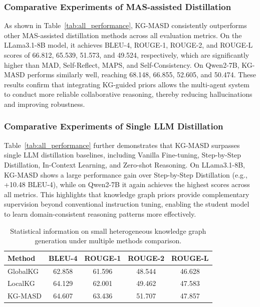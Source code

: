 \documentclass[preprint,12pt]{elsarticle}
\def\textbf#1{#1}%
\begin{document}
\subsubsection{Comparative Experiments of MAS-assisted Distillation}
As shown in Table~\ref{tab:all_performance}, KG-MASD consistently outperforms other MAS-assisted distillation methods across all evaluation metrics.
On the LLama3.1-8B model, it achieves BLEU-4, ROUGE-1, ROUGE-2, and ROUGE-L scores of \textbf{66.812}, \textbf{65.539}, \textbf{51.573}, and \textbf{49.524}, respectively, which are significantly higher than MAD, Self-Reflect, MAPS, and Self-Consistency.
On Qwen2-7B, KG-MASD performs similarly well, reaching \textbf{68.148}, \textbf{66.855}, \textbf{52.605}, and \textbf{50.474}.
These results confirm that integrating KG-guided priors allows the multi-agent system to conduct more reliable collaborative reasoning, thereby reducing hallucinations and improving robustness.

\subsubsection{Comparative Experiments of Single LLM Distillation}
Table~\ref{tab:all_performance} further demonstrates that KG-MASD surpasses single LLM distillation baselines, including Vanilla Fine-tuning, Step-by-Step Distillation, In-Context Learning, and Zero-shot Reasoning.
On LLama3.1-8B, KG-MASD shows a large performance gain over Step-by-Step Distillation (e.g., +10.48 BLEU-4), while on Qwen2-7B it again achieves the highest scores across all metrics.
This highlights that knowledge graph priors provide complementary supervision beyond conventional instruction tuning, enabling the student model to learn domain-consistent reasoning patterns more effectively.


\begin{table}[H]
\centering
    \renewcommand{\arraystretch}{1.1} %
\begin{tabular}{l c c c c}
\toprule
\textbf{Method} & \textbf{BLEU-4} & \textbf{ROUGE-1} & \textbf{ROUGE-2} & \textbf{ROUGE-L} \\
\midrule
GlobalKG & 62.858 & 61.596 & 48.544 & 46.628 \\
LocalKG & 64.129 & 62.001 & 49.462 & 47.583 \\
KG-MASD & 64.607 & 63.436 & 51.707 & 47.857 \\
\bottomrule
\end{tabular}
\caption{Statistical information on small heterogeneous knowledge graph generation under multiple methods comparison.}
\label{tab:ablation}
\end{table}
\end{document}
